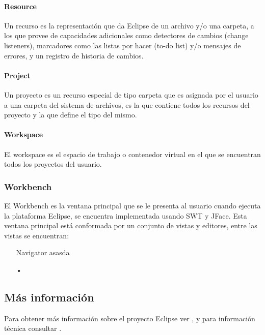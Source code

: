\documentclass[a4paper,12pt,oneside]{book}
\begin{document}
\paragraph{Resource} Un recurso es la representación que da Eclipse de un archivo y/o una carpeta, a los que provee de capacidades adicionales como detectores de cambios (change listeners), marcadores como las listas por hacer (to-do list) y/o mensajes de errores, y un registro de historia de cambios.

\paragraph{Project} Un proyecto es un recurso especial de tipo carpeta que es asignada por el usuario a una carpeta del sistema de archivos, es la que contiene todos los recursos del proyecto y la que define el tipo del mismo.

\paragraph{Workspace} El workspace es el espacio de trabajo o contenedor virtual en el que se encuentran todos los proyectos del usuario.


\subsubsection{Workbench}

El Workbench es la ventana principal que se le presenta al usuario cuando ejecuta la plataforma Eclipse, se encuentra implementada usando SWT y JFace. Esta ventana principal está conformada por un conjunto de vistas y editores, entre las vistas se encuentran:

\begin{itemize}

\item[Navigator] asasda

\item[•]

\end{itemize}


\subsection{Más información}

Para obtener más información sobre el proyecto Eclipse ver \cite[\url{www.eclipse.org}]{Eclipse}, y para información técnica consultar \cite[Eclipse Platform Technical Overview]{EclipseTech}.
\end{document}
